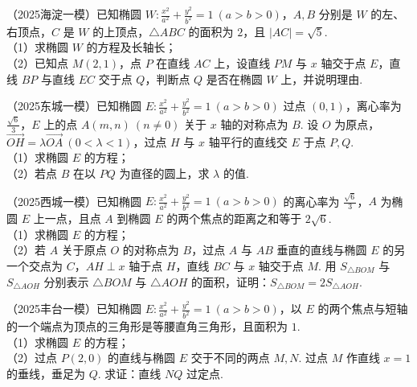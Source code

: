 \begin{example} %
（2025海淀一模）已知椭圆 $W:\frac{x^2}{a^2}+\frac{y^2}{b^2}=1\ (a>b>0)$，$A,B$ 分别是 $W$ 的左、右顶点，$C$ 是 $W$ 的上顶点，$\triangle ABC$ 的面积为 $2$，且 $\lvert AC\rvert=\sqrt{5}$.\\
（1）求椭圆 $W$ 的方程及长轴长；\\
（2）已知点 $M(2,1)$，点 $P$ 在直线 $AC$ 上，设直线 $PM$ 与 $x$ 轴交于点 $E$，直线 $BP$ 与直线 $EC$ 交于点 $Q$，判断点 $Q$ 是否在椭圆 $W$ 上，并说明理由.
\end{example}

\begin{example} %
（2025东城一模）已知椭圆 $E:\frac{x^2}{a^2}+\frac{y^2}{b^2}=1\ (a>b>0)$ 过点 $(0,1)$，离心率为 $\frac{\sqrt{6}}{3}$，$E$ 上的点 $A(m,n)\ (n\neq0)$ 关于 $x$ 轴的对称点为 $B$. 设 $O$ 为原点，$\overrightarrow{OH}=\lambda\overrightarrow{OA}\ (0<\lambda<1)$，过点 $H$ 与 $x$ 轴平行的直线交 $E$ 于点 $P,Q$.\\
（1）求椭圆 $E$ 的方程；\\
（2）若点 $B$ 在以 $PQ$ 为直径的圆上，求 $\lambda$ 的值.
\end{example}

\begin{example} %
（2025西城一模）已知椭圆 $E:\frac{x^2}{a^2}+\frac{y^2}{b^2}=1\ (a>b>0)$ 的离心率为 $\frac{\sqrt{6}}{3}$，$A$ 为椭圆 $E$ 上一点，且点 $A$ 到椭圆 $E$ 的两个焦点的距离之和等于 $2\sqrt{6}$.\\
（1）求椭圆 $E$ 的方程；\\
（2）若 $A$ 关于原点 $O$ 的对称点为 $B$，过点 $A$ 与 $AB$ 垂直的直线与椭圆 $E$ 的另一个交点为 $C$，$AH\perp x$ 轴于点 $H$，直线 $BC$ 与 $x$ 轴交于点 $M$. 用 $S_{\triangle BOM}$ 与 $S_{\triangle AOH}$ 分别表示 $\triangle BOM$ 与 $\triangle AOH$ 的面积，证明：$S_{\triangle BOM}=2S_{\triangle AOH}$.
\end{example}

\begin{example} %
（2025丰台一模）已知椭圆 $E:\frac{x^2}{a^2}+\frac{y^2}{b^2}=1\ (a>b>0)$，以 $E$ 的两个焦点与短轴的一个端点为顶点的三角形是等腰直角三角形，且面积为 $1$.\\
（1）求椭圆 $E$ 的方程；\\
（2）过点 $P(2,0)$ 的直线与椭圆 $E$ 交于不同的两点 $M,N$. 过点 $M$ 作直线 $x=1$ 的垂线，垂足为 $Q$. 求证：直线 $NQ$ 过定点.
\end{example}

